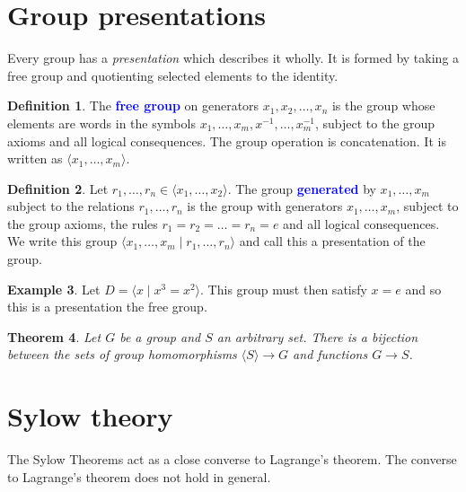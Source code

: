 \documentclass[12pt]{report}
\newcommand{\indx}[1]{\index{#1}\textbf{\textcolor{blue}{#1}}}
\newtheorem{theorem}{Theorem}[section] %
\theoremstyle{definition}
\newtheorem{definition}[theorem]{Definition}
\newtheorem{example}[theorem]{Example}
\begin{document}
\section{Group presentations}
\label{sec:group-theory:group-presentations}

Every group has a \textit{presentation} which describes it wholly.
%
It is formed by taking a free group and quotienting selected elements to the identity.

\begin{definition}\label{def:group-theory:free-group}
  The \indx{free group} on generators \(x_{1}, x_{2}, \ldots, x_{n}\) is the group whose elements are words in the symbols \(x_{1}, \ldots, x_{m},x^{-1}, \ldots, x^{-1}_{m}\), subject to the group axioms and all logical consequences.
  The group operation is concatenation.
  It is written as \(\langle x_{1}, \ldots, x_{m} \rangle\).
\end{definition}

\begin{definition}
 \label{def:group-theory:generated-by-subject-to-relations}
 Let \(r_{1}, \ldots, r_{n} \in \langle x_{1}, \ldots, x_{2} \rangle\).
 The group \indx{generated} by \(x_{1}, \ldots, x_{m}\) subject to the relations \(r_{1}, \ldots, r_{n}\) is the group with generators \(x_{1}, \ldots, x_{m}\), subject to the group axioms, the rules \(r_{1} = r_{2}= \ldots = r_{n} = e\) and all logical consequences.
 We write this group \(\langle x_{1}, \ldots, x_{m} \mid r_{1}, \ldots, r_{n} \rangle\) and call this a presentation of the group.
\end{definition}

\begin{example}
  Let \(D = \langle x \mid x^{3} = x^{2} \rangle\).
  This group must then satisfy \(x=e\) and so this is a presentation the free group.
\end{example}

\begin{theorem}
  \label{thm:group-theory:universal-property-of-free-groups}
  Let \(G\) be a group and \(S\) an arbitrary set.
  There is a bijection between the sets of group homomorphisms \(\langle S \rangle \to G\) and functions \(G \to S\).
\end{theorem}



\section{Sylow theory}
The Sylow Theorems act as a close converse to Lagrange's theorem. The converse to Lagrange's theorem does not hold in general.
\end{document}
